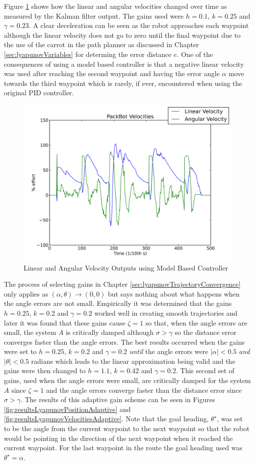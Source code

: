 Figure \ref{fig:resultsLyapunovVelocities} shows how the linear and angular velocities changed over time as measured by the Kalman filter output. The gains used were $h=0.1$, $k=0.25$ and $\gamma=0.23$. A clear deceleration can be seen as the robot approaches each waypoint although the linear velocity does not go to zero until the final waypoint due to the use of the carrot in the path planner as discussed in Chapter \ref{sec:lyapunovVariables} for determing the error distance $e$. One of the consequences of using a model based controller is that a negative linear velocity was used after reaching the second waypoint and having the error angle $\alpha$ move towards the third waypoint which is rarely, if ever, encountered when using the original PID controller.

\begin{figure}[ht!]
	\centering
	\includegraphics[width=.5\textwidth]{images/20100918_1717_velocities}
	\caption{Linear and Angular Velocity Outputs using Model Based Controller}
	\label{fig:resultsLyapunovVelocities}
\end{figure}

The process of selecting gains in Chapter \ref{sec:lyapunovTrajectoryConvergence} only applies as $(\alpha, \theta)\to(0,0)$ but says nothing about what happens when the angle errors are not small. Empirically it was determined that the gains $h=0.25$, $k=0.2$ and $\gamma=0.2$ worked well in creating smooth trajectories and later it was found that these gains cause $\zeta=1$ so that, when the angle errors are small, the system $A$ is critically damped although $\sigma>\gamma$ so the distance error converges faster than the angle errors. The best results occurred when the gains were set to $h=0.25$, $k=0.2$ and $\gamma=0.2$ \textit{until} the angle errors were $|\alpha|<0.5$ \textit{and} $|\theta|<0.5$ radians which leads to the linear approximation being valid and the gains were then changed to $h=1.1$, $k=0.42$ and $\gamma=0.2$. This second set of gains, used when the angle errors were small, are critically damped for the system $A$ since $\zeta=1$ and the angle errors converge faster than the distance error since $\sigma>\gamma$. The results of this adaptive gain scheme can be seen in Figures \ref{fig:resultsLyapunovPositionAdaptive} and \ref{fig:resultsLyapunovVelocitiesAdaptive}. Note that the goal heading, $\theta^\star$, was set to be the angle from the current waypoint to the next waypoint so that the robot would be pointing in the direction of the next waypoint when it reached the current waypoint. For the last waypoint in the route the goal heading used was $\theta^\star=\alpha$.

